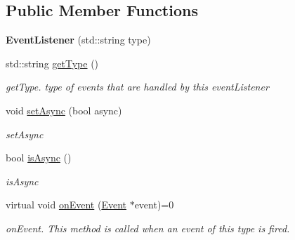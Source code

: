 \subsection*{Public Member Functions}
\begin{DoxyCompactItemize}
\item 
\hypertarget{classdrobot_1_1event_1_1EventListener_ad9aa9dca8021eaa6d4499f8dca868305}{{\bfseries Event\-Listener} (std\-::string type)}\label{classdrobot_1_1event_1_1EventListener_ad9aa9dca8021eaa6d4499f8dca868305}

\item 
std\-::string \hyperlink{classdrobot_1_1event_1_1EventListener_af6f3b538bc3595de13959d9e35c0449e}{get\-Type} ()
\begin{DoxyCompactList}\small\item\em get\-Type. type of events that are handled by this event\-Listener \end{DoxyCompactList}\item 
void \hyperlink{classdrobot_1_1event_1_1EventListener_a2159b1adafa0d7c317b444029832b3b9}{set\-Async} (bool async)
\begin{DoxyCompactList}\small\item\em set\-Async \end{DoxyCompactList}\item 
bool \hyperlink{classdrobot_1_1event_1_1EventListener_abd1b9a72670da3a2ac279e7bd43f4e82}{is\-Async} ()
\begin{DoxyCompactList}\small\item\em is\-Async \end{DoxyCompactList}\item 
virtual void \hyperlink{classdrobot_1_1event_1_1EventListener_ae5e30e4a518f6752a09f44f8dc6cdc51}{on\-Event} (\hyperlink{classdrobot_1_1event_1_1Event}{Event} $\ast$event)=0
\begin{DoxyCompactList}\small\item\em on\-Event. This method is called when an event of this type is fired. \end{DoxyCompactList}\end{DoxyCompactItemize}
